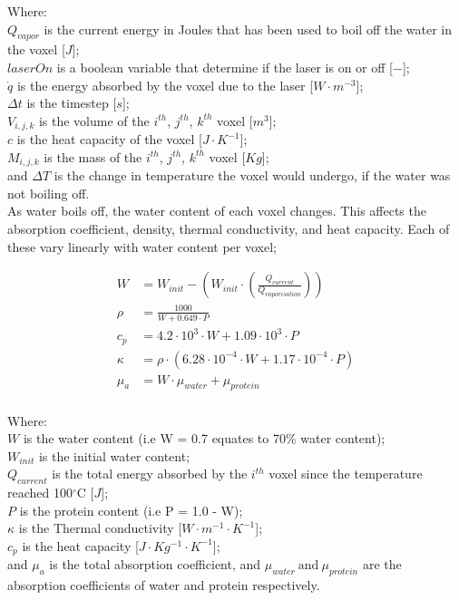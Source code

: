 \noindent Where:\\
	\indent $Q_{vapor}$ is the current energy in Joules that has been used to boil off the water in the voxel [$J$];\\
	\indent $laserOn$ is a boolean variable that determine if the laser is on or off [$-$];\\
	\indent $\dot{q}$ is the energy absorbed by the voxel due to the laser [$W\cdot m^{-3}$];\\
	\indent $\Delta t$ is the timestep [$s$];\\
	\indent $V_{i,j,k}$ is the volume of the $i^{th}$, $j^{th}$, $k^{th}$ voxel [$m^3$];\\
	\indent $c$ is the heat capacity of the voxel [$J\cdot K^{-1}$];\\
	\indent $M_{i,j,k}$ is the mass of the $i^{th}$, $j^{th}$, $k^{th}$ voxel [$Kg$];\\
	\indent and $\Delta T$ is the change in temperature the voxel would undergo, if the water was not boiling off.\\
	
As water boils off, the water content of each voxel changes. This affects the absorption coefficient, density, thermal conductivity, and heat capacity. Each of these vary linearly with water content per voxel\cite{choi2001analysis};

\begin{align}
W &= W_{init} - \left(W_{init} \cdot \left(\tfrac{Q_{current}}{Q_{vaporisation}}\right)\right) \\
\rho &= \frac{1000}{W + 0.649\cdot P} \\
c_p &= 4.2\cdot 10^{3}\cdot W + 1.09\cdot 10^{3}\cdot P \\
\kappa &= \rho \cdot (6.28\cdot 10^{-4}\cdot W + 1.17\cdot 10^{-4} \cdot P)\\
\mu_a &= W \cdot \mu_{water} + \mu_{protein}\\
\end{align}

\noindent Where:\\
\indent $W$ is the water content (i.e W = 0.7 equates to 70\% water content);\\
\indent $W_{init}$ is the initial water content;\\
\indent $Q_{current}$ is the total energy absorbed by the $i^{th}$ voxel since the temperature reached 100$^{\circ}$C [$J$];\\
\indent $P$ is the protein content (i.e P = 1.0 - W);\\
\indent $\kappa$ is the Thermal conductivity [$W\cdot m^{-1}\cdot K^{-1}$];\\
\indent $c_p$ is the heat capacity [$J\cdot Kg^{-1}\cdot K^{-1}$];\\
\indent and $\mu_a$ is the total absorption coefficient, and $\mu_{water}\ \text{and}\ \mu_{protein}$ are the absorption coefficients of water and protein respectively.\\

